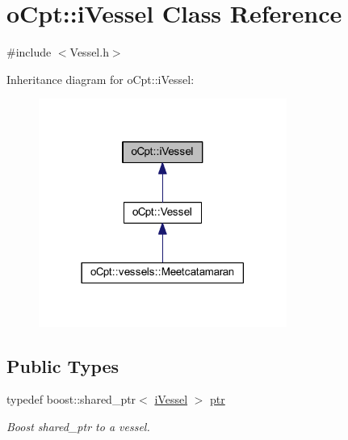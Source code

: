 \hypertarget{classo_cpt_1_1i_vessel}{}\section{o\+Cpt\+:\+:i\+Vessel Class Reference}
\label{classo_cpt_1_1i_vessel}


{\ttfamily \#include $<$Vessel.\+h$>$}



Inheritance diagram for o\+Cpt\+:\+:i\+Vessel\+:\nopagebreak
\begin{figure}[H]
\begin{center}
\leavevmode
\includegraphics[width=230pt]{classo_cpt_1_1i_vessel__inherit__graph}
\end{center}
\end{figure}
\subsection*{Public Types}
\begin{DoxyCompactItemize}
\item 
typedef boost\+::shared\+\_\+ptr$<$ \hyperlink{classo_cpt_1_1i_vessel}{i\+Vessel} $>$ \hyperlink{classo_cpt_1_1i_vessel_a43711a596f3bdfd0ca732ed3901edc97}{ptr}
\begin{DoxyCompactList}\small\item\em Boost shared\+\_\+ptr to a vessel. \end{DoxyCompactList}\end{DoxyCompactItemize}
